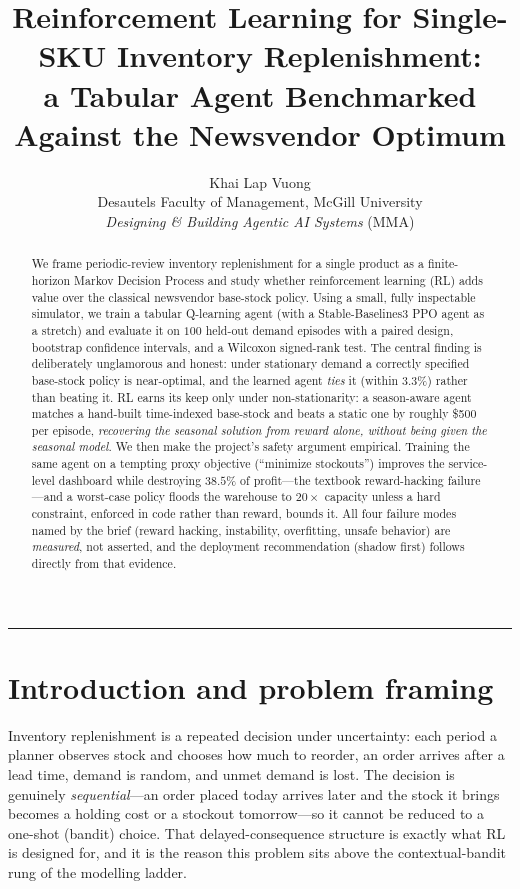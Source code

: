 \documentclass[11pt]{article}
\title{\textbf{Reinforcement Learning for Single-SKU Inventory Replenishment:\\
a Tabular Agent Benchmarked Against the Newsvendor Optimum}}
\author{Khai Lap Vuong\\[2pt]
\small Desautels Faculty of Management, McGill University\\
\small \emph{Designing \& Building Agentic AI Systems} (MMA)}
\date{}
\begin{document}
\maketitle

\begin{abstract}
\noindent
We frame periodic-review inventory replenishment for a single product as a finite-horizon
Markov Decision Process and study whether reinforcement learning (RL) adds value over the
classical newsvendor base-stock policy. Using a small, fully inspectable simulator, we train a
tabular Q-learning agent (with a Stable-Baselines3 PPO agent as a stretch) and evaluate it on
$100$ held-out demand episodes with a paired design, bootstrap confidence intervals, and a
Wilcoxon signed-rank test. The central finding is deliberately unglamorous and honest: under
stationary demand a correctly specified base-stock policy is near-optimal, and the learned agent
\emph{ties} it (within $3.3\%$) rather than beating it. RL earns its keep only under
non-stationarity: a season-aware agent matches a hand-built time-indexed base-stock and beats a
static one by roughly \$500 per episode, \emph{recovering the seasonal solution from reward
alone, without being given the seasonal model}. We then make the project's safety argument
empirical. Training the same agent on a tempting proxy objective (``minimize stockouts'')
improves the service-level dashboard while destroying $38.5\%$ of profit---the textbook
reward-hacking failure---and a worst-case policy floods the warehouse to $20\times$ capacity
unless a hard constraint, enforced in code rather than reward, bounds it. All four failure modes
named by the brief (reward hacking, instability, overfitting, unsafe behavior) are
\emph{measured}, not asserted, and the deployment recommendation (shadow first) follows directly
from that evidence.
\end{abstract}

\tableofcontents
\medskip
\hrule

\section{Introduction and problem framing}
\label{sec:intro}

Inventory replenishment is a repeated decision under uncertainty: each period a planner observes
stock and chooses how much to reorder, an order arrives after a lead time, demand is random, and
unmet demand is lost. The decision is genuinely \emph{sequential}---an order placed today arrives
later and the stock it brings becomes a holding cost or a stockout tomorrow---so it cannot be
reduced to a one-shot (bandit) choice. That delayed-consequence structure is exactly what
RL is designed for, and it is the reason this problem sits above the contextual-bandit rung of
the modelling ladder.
\end{document}
